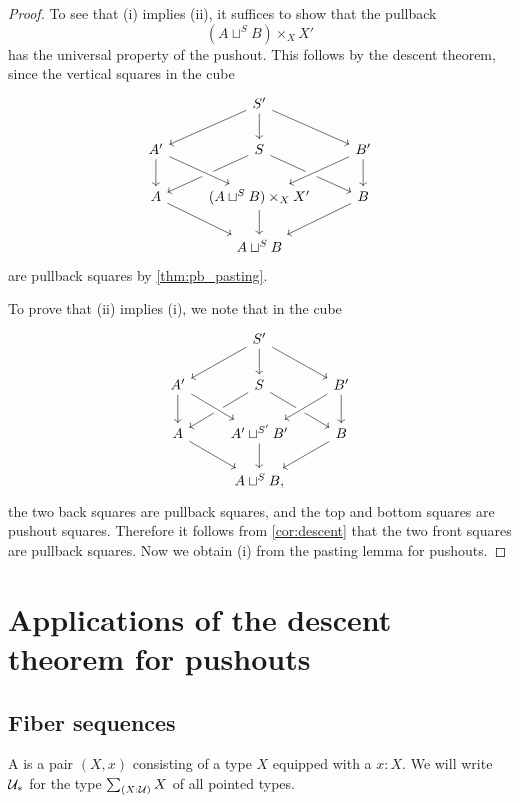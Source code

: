\begin{proof}
To see that (i) implies (ii), it suffices to show that the pullback 
\begin{equation*}
(A\sqcup^{S} B)\times_{X}X'
\end{equation*}
has the universal property of the pushout. This follows by the descent theorem, since the vertical squares in the cube
\begin{equation*}
\begin{tikzcd}
& S' \arrow[dl] \arrow[dr] \arrow[d] \\
A' \arrow[d] & S \arrow[dl] \arrow[dr] & B' \arrow[dl,crossing over] \arrow[d] \\
A \arrow[dr] & (A\sqcup^{S} B)\times_{X}X' \arrow[d] \arrow[from=ul,crossing over] & B \arrow[dl] \\
& A\sqcup^{S} B
\end{tikzcd}
\end{equation*}
are pullback squares by \cref{thm:pb_pasting}.

To prove that (ii) implies (i), we note that in the cube
\begin{equation*}
\begin{tikzcd}
& S' \arrow[dl] \arrow[dr] \arrow[d] \\
A' \arrow[d] & S \arrow[dl] \arrow[dr] & B' \arrow[dl,crossing over] \arrow[d] \\
A \arrow[dr] & A'\sqcup^{S'}B' \arrow[d] \arrow[from=ul,crossing over] & B \arrow[dl] \\
& A\sqcup^S B,
\end{tikzcd}
\end{equation*}
the two back squares are pullback squares, and the top and bottom squares are pushout squares. Therefore it follows from \cref{cor:descent} that the two front squares are pullback squares. Now we obtain (i) from the pasting lemma for pushouts.
\end{proof}

\section{Applications of the descent theorem for pushouts}

\subsection{Fiber sequences}

\begin{defn}
A  is a pair $(X,x)$ consisting of a type $X$ equipped with a  $x:X$. We will write $\mathcal{U}_\ast$ for the type $\sm{X:\UU}X$ of all pointed types.
\end{defn}

